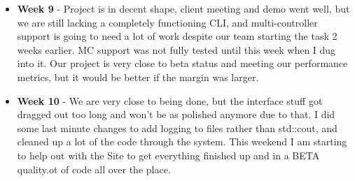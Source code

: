 \documentclass[onecolumn, draftclsnofoot,10pt, compsoc]{IEEEtran}
\begin{document}
\begin{itemize}
					\item \textbf{Week 9} - Project is in decent shape, client meeting and demo went well, but we are still lacking a completely functioning CLI, and multi-controller support is going to need a lot of work despite our team starting the task 2 weeks earlier. MC support was not fully tested until this week when I dug into it. Our project is very close to beta status and meeting our performance metrics, but it would be better if the margin was larger. 
					\item \textbf{Week 10} - We are very close to being done, but the interface stuff got dragged out too long and won't be as polished anymore due to that. I did some last minute changes to add logging to files rather than std::cout, and cleaned up a lot of the code through the system. This weekend I am starting to help out with the Site to get everything finished up and in a BETA quality.ot of code all over the place. 
				\end{itemize}
\end{document}

